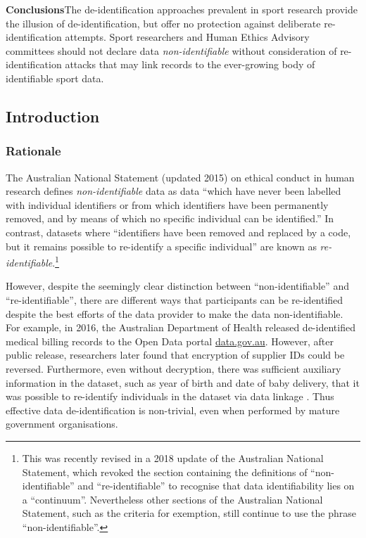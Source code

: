 \textbf{Conclusions}\hs The de-identification approaches prevalent in sport research provide the illusion of de-identification, but offer no protection against deliberate re-identification attempts. Sport researchers and Human Ethics Advisory committees should not declare data \textit{non-identifiable} without consideration of re-identification attacks that may link records to the ever-growing body of identifiable sport data.

\subsection{Introduction}

\subsubsection{Rationale}

The Australian National Statement (updated 2015) \cite{NationalStatement2015} on ethical conduct in human research defines \textit{non-identifiable} data as data ``which have never been labelled with individual identifiers or from which identifiers have been permanently removed, and by means of which no specific individual can be identified.'' In contrast, datasets where ``identifiers have been removed and replaced by a code, but it remains possible to re-identify a specific individual'' are known as \textit{re-identifiable}.\footnote{This was recently revised in a 2018 update of the Australian National Statement, which revoked the section containing the definitions of ``non-identifiable'' and ``re-identifiable'' to recognise that data identifiability lies on a ``continuum''. Nevertheless other sections of the Australian National Statement, such as the criteria for exemption, still continue to use the phrase ``non-identifiable''.}

However, despite the seemingly clear distinction between ``non-identifiable'' and ``re-identifiable'', there are different ways that participants can be re-identified despite the best efforts of the data provider to make the data non-identifiable. For example, in 2016, the Australian Department of Health released de-identified medical billing records to the Open Data portal \url{data.gov.au}. However, after public release, researchers later found that encryption of supplier IDs could be reversed. Furthermore, even without decryption, there was sufficient auxiliary information in the dataset, such as year of birth and date of baby delivery, that it was possible to re-identify individuals in the dataset via data linkage \cite{Culnane2017}. Thus effective data de-identification is non-trivial, even when performed by mature government organisations.

